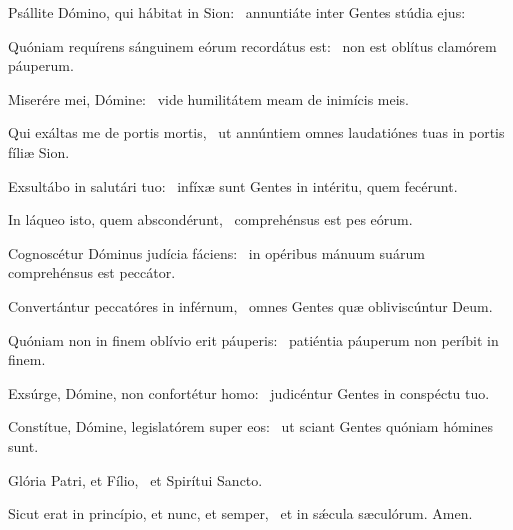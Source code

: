 \item Psállite Dómino, qui hábitat in Sion:~\psstar{} annuntiáte inter Gentes stúdia ejus:
\item Quóniam requírens sánguinem eórum recordátus est:~\psstar{} non est oblítus clamórem páuperum.
\item Miserére mei, Dómine:~\psstar{} vide humilitátem meam de inimícis meis.
\item Qui exáltas me de portis mortis,~\psstar{} ut annúntiem omnes laudatiónes tuas in portis fíliæ Sion.
\item Exsultábo in salutári tuo:~\psstar{} infíxæ sunt Gentes in intéritu, quem fecérunt.
\item In láqueo isto, quem abscondérunt,~\psstar{} comprehénsus est pes eórum.
\item Cognoscétur Dóminus judícia fáciens:~\psstar{} in opéribus mánuum suárum comprehénsus est peccátor.
\item Convertántur peccatóres in inférnum,~\psstar{} omnes Gentes quæ obliviscúntur Deum.
\item Quóniam non in finem oblívio erit páuperis:~\psstar{} patiéntia páuperum non períbit in finem.
\item Exsúrge, Dómine, non confortétur homo:~\psstar{} judicéntur Gentes in conspéctu tuo.
\item Constítue, Dómine, legislatórem super eos:~\psstar{} ut sciant Gentes quóniam hómines sunt.
\item Glória Patri, et Fílio,~\psstar{} et Spirítui Sancto.
\item Sicut erat in princípio, et nunc, et semper,~\psstar{} et in sǽcula sæculórum. Amen.
